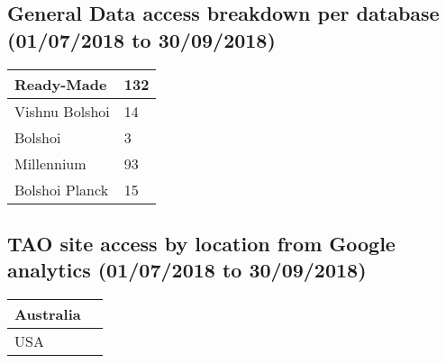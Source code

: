 \documentclass{article}%
\begin{document}
\subsection{General Data access breakdown per database (01/07/2018 to 30/09/2018)}%

%
\begin{longtabu}{X[l] X[l]}%
Ready{-}Made&132\\%
\hline%
Vishnu Bolshoi&14\\%
\hline%
Bolshoi&3\\%
\hline%
Millennium&93\\%
\hline%
Bolshoi Planck&15\\%
\hline%
\end{longtabu}%
\subsection{TAO site access by location from Google analytics (01/07/2018 to 30/09/2018)}%

%
\begin{longtabu}{X[l] X[l]}%
Australia&\\%
\hline%
USA&\\%
\hline%
\end{longtabu}%
\end{document}
